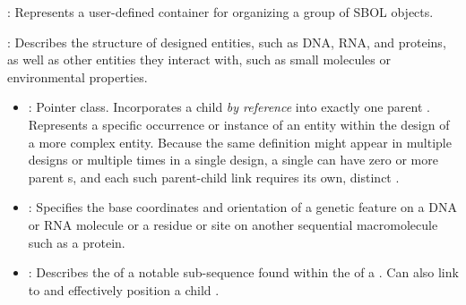 \begin{description}

\item \emph{}:
Represents a user-defined container for organizing a group of SBOL objects.

\item \emph{}: Describes the structure of designed entities, such as DNA, RNA, and proteins, as well as other entities they interact with, such as small molecules or environmental properties.

\begin{itemize}
\item \emph{}:
Pointer class. Incorporates a child  \textit{by reference} into exactly one parent . Represents a specific occurrence or instance of an entity within the design of a more complex entity. Because the same definition might appear in  multiple designs or multiple times in a single design, a single  can have zero or more parent s, and each such parent-child link requires its own, distinct .

\item \emph{}:
Specifies the base coordinates and orientation of a genetic feature on a DNA or RNA molecule or a residue or site on another sequential macromolecule such as a protein.

\item \emph{}:
Describes the  of a notable sub-sequence found within the  of a . Can also link to and effectively position a child .


\end{itemize}
\end{description}
